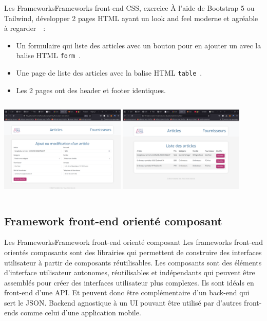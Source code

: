 \documentclass{beamer}
\begin{document}
    \begin{frame}{Les Frameworks}{Frameworks front-end CSS, exercice \execcounterdispinc{}}
        À l'aide de Bootstrap 5 ou Tailwind, développer 2 pages HTML ayant un look and feel moderne et agréable à regarder~~:
        \begin{itemize}
            \item Un formulaire qui liste des articles avec un bouton pour en ajouter un avec la balise HTML \lstinline{form}~.
            \item Une page de liste des articles avec la balise HTML \lstinline{table}~.
            \item Les 2 pages ont des header et footer identiques.
        \end{itemize}
        \bigbreak
        \begin{columns}
            \centering
            \includegraphics[width=6cm]{image/form-item}
            \centering
            \includegraphics[width=6cm]{image/list-items}
        \end{columns}
    \end{frame}

    \subsection{Framework front-end orienté composant}\label{subsec:framewok-component}

    \begin{frame}{Les Frameworks}{Framework front-end orienté composant}
        Les frameworks front-end orientés composants sont des librairies qui permettent de construire des interfaces utilisateur à partir de composants réutilisables.
        \bigbreak
        Les composants sont des éléments d'interface utilisateur autonomes, réutilisables et indépendants qui peuvent être assemblés pour créer des interfaces utilisateur plus complexes.
        \bigbreak
        Ils sont idéals en front-end d'une API.
        Et peuvent donc être complémentaire d'un back-end qui sert le JSON.
        Backend agnostique à un UI pouvant être utilisé par d'autres front-ends comme celui d'une application mobile.
    \end{frame}
\end{document}
